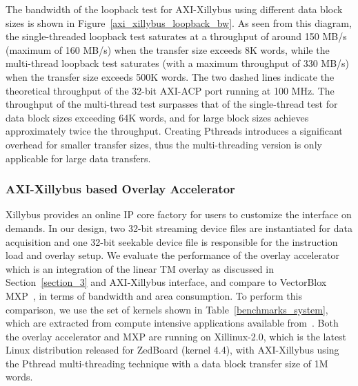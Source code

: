 The bandwidth of the loopback test for AXI-Xillybus using different data block sizes is shown in Figure~\ref{axi_xillybus_loopback_bw}. 
As seen from this diagram, the single-threaded loopback test saturates at a throughput of around 150 MB/s (maximum of 160 MB/s) when the transfer size exceeds 8K words, while the multi-thread loopback test saturates (with a maximum throughput of 330 MB/s) when the transfer size exceeds 500K words. 
The two dashed lines indicate the theoretical throughput of the 32-bit AXI-ACP port running at 100 MHz.
The throughput of the multi-thread test surpasses that of the single-thread test for data block sizes exceeding 64K words, and for large block sizes achieves approximately twice the throughput. 
Creating Pthreads introduces a significant overhead for smaller transfer sizes, thus the multi-threading version is only applicable for large data transfers. 



\subsubsection{AXI-Xillybus based Overlay Accelerator}
Xillybus provides an online IP core factory for users to customize the interface on demands.
In our design, two 32-bit streaming device files are instantiated for data acquisition and one 32-bit seekable device file is responsible for the instruction load and overlay setup. 
We evaluate the performance of the overlay accelerator which is an integration of the linear TM overlay as discussed in Section~\ref{section_3} and AXI-Xillybus interface, and compare to VectorBlox MXP~\cite{severance2013embedded}, in terms of bandwidth and area consumption. 
To perform this comparison, we use the set of kernels shown in Table~\ref{benchmarks_system}, which are extracted from compute intensive applications available from~\cite{gopalakrishnan2007finding, hoy2015performance}. 
Both the overlay accelerator and MXP are running on Xillinux-2.0, which is the latest Linux distribution released for ZedBoard (kernel 4.4), with AXI-Xillybus using the Pthread multi-threading technique with a data block transfer size of 1M words.

